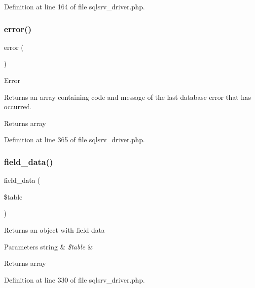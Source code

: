 Definition at line 164 of file sqlsrv\+\_\+driver.\+php.

\mbox{\label{class_c_i___d_b__sqlsrv__driver_a43b8d30b879d4f09ceb059b02af2bc02}} 
\subsubsection{\texorpdfstring{error()}{error()}}
{\footnotesize\ttfamily error (\begin{DoxyParamCaption}{ }\end{DoxyParamCaption})}

Error

Returns an array containing code and message of the last database error that has occurred.

\begin{DoxyReturn}{Returns}
array 
\end{DoxyReturn}


Definition at line 365 of file sqlsrv\+\_\+driver.\+php.

\mbox{\label{class_c_i___d_b__sqlsrv__driver_a90355121e1ed009e0efdbd544ab56efa}} 
\subsubsection{\texorpdfstring{field\_data()}{field\_data()}}
{\footnotesize\ttfamily field\+\_\+data (\begin{DoxyParamCaption}\item[{}]{\$table }\end{DoxyParamCaption})}

Returns an object with field data


\begin{DoxyParams}[1]{Parameters}
string & {\em \$table} & \\
\hline
\end{DoxyParams}
\begin{DoxyReturn}{Returns}
array 
\end{DoxyReturn}


Definition at line 330 of file sqlsrv\+\_\+driver.\+php.

